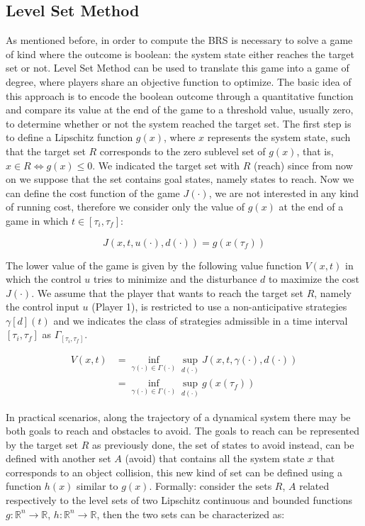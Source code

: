 \subsection{Level Set Method}
As mentioned before, in order to compute the BRS is necessary to solve a game of kind where the outcome is boolean: the system state either reaches the target set or not. Level Set Method can be used to translate this game into a game of degree, where players share an objective function to optimize. The basic idea of this approach is to encode the boolean outcome through a quantitative function and compare its value at the end of the game to a threshold value, usually zero, to determine whether or not the system reached the target set.
The first step is to define a Lipschitz function $g(x)$, where $x$ represents the system state, such that the target set $R$ corresponds to the zero sublevel set of $g(x)$, that is, $x\in R \Leftrightarrow g(x) \leq 0$. We indicated the target set with $R$ (reach) since from now on we suppose that the set contains goal states, namely states to reach. Now we can define the cost function of the game $J(\cdot)$, we are not interested in any kind of running cost, therefore we consider only the value of $g(x)$ at the end of a game in which $t \in [\tau_i, \tau_f]$:

\begin{equation}
\label{eq:j_level_set}
    J(x, t, u(\cdot), d(\cdot)) = g(x(\tau_f))
\end{equation}
					
The lower value of the game is given by the following value function $V(x,t)$ in which the control $u$ tries to minimize and the disturbance $d$ to maximize the cost $J(\cdot)$.
We assume that the player that wants to reach the target set $R$, namely the control input $u$ (Player 1), is restricted to use a non-anticipative strategies $\gamma[d](t)$ and we indicates the class of strategies admissible in a time interval $[\tau_i, \tau_f]$ as $\Gamma_{[\tau_i, \tau_f]}$.

\begin{equation}
\begin{split}
    V(x, t) 
    & = \inf_{\gamma(\cdot) \in \Gamma(\cdot) } \sup_{d(\cdot)} J(x, t, \gamma(\cdot), d(\cdot))    \\
    & = \inf_{\gamma(\cdot) \in \Gamma(\cdot) } \sup_{d(\cdot)} g(x(\tau_f))
\end{split}
\end{equation}

In practical scenarios, along the trajectory of a dynamical system there may be both goals to reach and obstacles to avoid. The goals to reach can be represented by the target set $R$ as previously done, the set of states to avoid instead, can be defined with another set $A$ (avoid) that contains all the system state $x$ that corresponds to an object collision, this new kind of set can be defined using a function $h(x)$ similar to $g(x)$. Formally: consider the sets $R$, $A$ related respectively to the level sets of two Lipschitz continuous and bounded functions $g: \mathbb{R}^n \rightarrow \mathbb{R}$, $h: \mathbb{R}^n \rightarrow \mathbb{R}$, then the two sets can be characterized as:


